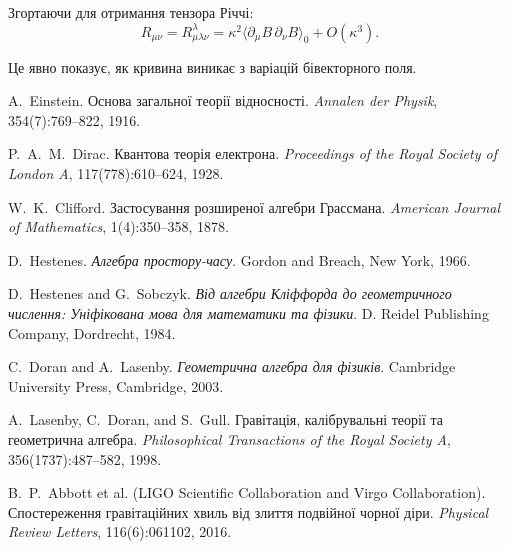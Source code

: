 \documentclass[11pt,a4paper]{article}
\numberwithin{equation}{section}
\theoremstyle{plain}
\theoremstyle{definition}
\theoremstyle{remark}
\begin{document}
Згортаючи для отримання тензора Річчі:
\begin{equation}
R_{\mu\nu} = R^\lambda_{\mu\lambda\nu} = \kappa^2 \langle \partial_\mu B \, \partial_\nu B \rangle_0 + O(\kappa^3).
\end{equation}

Це явно показує, як кривина виникає з варіацій бівекторного поля.


\begin{thebibliography}{9}

A.~Einstein.
\newblock Основа загальної теорії відносності.
\newblock \emph{Annalen der Physik}, 354(7):769--822, 1916.

P.~A.~M.~Dirac.
\newblock Квантова теорія електрона.
\newblock \emph{Proceedings of the Royal Society of London A}, 117(778):610--624, 1928.

W.~K.~Clifford.
\newblock Застосування розширеної алгебри Грассмана.
\newblock \emph{American Journal of Mathematics}, 1(4):350--358, 1878.

D.~Hestenes.
\newblock \emph{Алгебра простору-часу}.
\newblock Gordon and Breach, New York, 1966.

D.~Hestenes and G.~Sobczyk.
\newblock \emph{Від алгебри Кліффорда до геометричного числення: Уніфікована мова для математики та фізики}.
\newblock D. Reidel Publishing Company, Dordrecht, 1984.

C.~Doran and A.~Lasenby.
\newblock \emph{Геометрична алгебра для фізиків}.
\newblock Cambridge University Press, Cambridge, 2003.

A.~Lasenby, C.~Doran, and S.~Gull.
\newblock Гравітація, калібрувальні теорії та геометрична алгебра.
\newblock \emph{Philosophical Transactions of the Royal Society A}, 356(1737):487--582, 1998.

B.~P.~Abbott et al. (LIGO Scientific Collaboration and Virgo Collaboration).
\newblock Спостереження гравітаційних хвиль від злиття подвійної чорної діри.
\newblock \emph{Physical Review Letters}, 116(6):061102, 2016.

\end{thebibliography}
\end{document}

